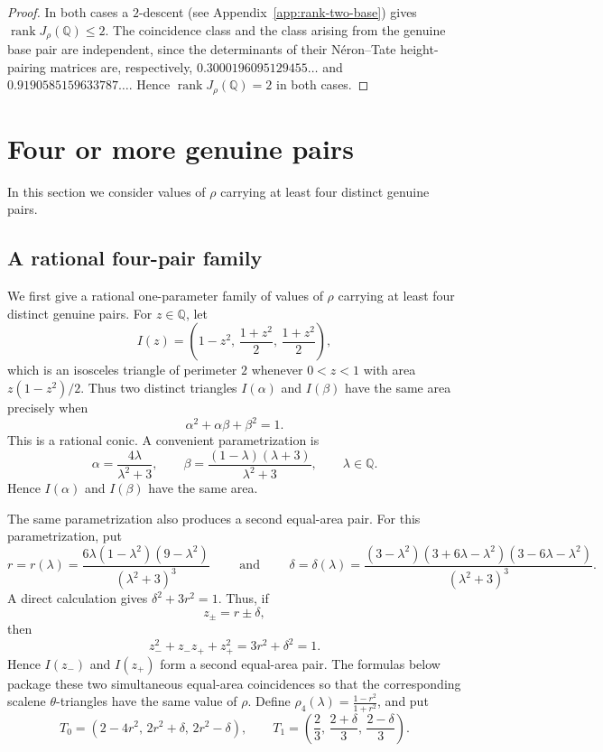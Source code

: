 \documentclass[11pt]{amsart}
\theoremstyle{plain}
\theoremstyle{remark}
\theoremstyle{plain}
\newcommand{\Q}{\mathbb{Q}}
\begin{document}
\begin{proof}
In both cases a $2$-descent
(see Appendix~\ref{app:rank-two-base}) gives
$\operatorname{rank}J_\rho(\Q)\leq2$. The coincidence class and the
class arising from the genuine base pair are independent, since the
determinants of their N\'eron--Tate height-pairing matrices are,
respectively,
$
0.3000196095129455\ldots $ and $
0.9190585159633787\ldots.$
Hence $\operatorname{rank}J_\rho(\Q)=2$ in both cases.
\end{proof}




\section{Four or more genuine pairs}
\label{sec:four-pairs}

In this section we consider values of $\rho$ carrying at least four
distinct genuine pairs.


\subsection{A rational four-pair family}
We first give a rational one-parameter family of values of $\rho$
carrying at least four distinct genuine pairs.
For $z\in\Q$, let
\[
I(z)=
\left(
1-z^2,\,
\frac{1+z^2}{2},\,
\frac{1+z^2}{2}
\right),
\]
which is an isosceles triangle of perimeter $2$ whenever $0<z<1$ with area $z(1-z^2)/2$.
Thus two distinct triangles $I(\alpha)$ and $I(\beta)$ have the same area precisely when \[ \alpha^2+\alpha \beta+\beta^2=1. \]
This is a rational conic.
A convenient parametrization is \[ \alpha=\frac{4\lambda}{\lambda^2+3}, \qquad \beta=\frac{(1-\lambda)(\lambda+3)}{\lambda^2+3}, \qquad \lambda\in\mathbb{Q}.\]
Hence $I(\alpha)$ and $I(\beta)$ have the same area.

The same parametrization also produces a second equal-area pair. For this parametrization, put
\[ r=r(\lambda) = \frac{6\lambda(1-\lambda^2)(9-\lambda^2)} {(\lambda^2+3)^3} \qquad \text{ and }\qquad\delta=\delta(\lambda) = \frac{(3-\lambda^2)(3+6\lambda-\lambda^2) (3-6\lambda-\lambda^2)} {(\lambda^2+3)^3}. \]
A direct calculation gives $\delta^2+3r^2=1$. Thus, if \[ z_\pm=r\pm\delta, \] then \[ z_-^2+z_-z_++z_+^2 = 3r^2+\delta^2 = 1. \] Hence $I(z_-)$ and $I(z_+)$ form a second equal-area pair. The formulas below package these two simultaneous equal-area coincidences so that the corresponding scalene $\theta$-triangles have the same value of $\rho$. Define $\rho_4(\lambda)=\frac{1-r^2}{1+r^2}$, and put \[ T_0= \left( 2-4r^2,\, 2r^2+\delta,\, 2r^2-\delta \right), \qquad T_1= \left( \frac{2}{3},\, \frac{2+\delta}{3},\, \frac{2-\delta}{3} \right). \]
\end{document}
